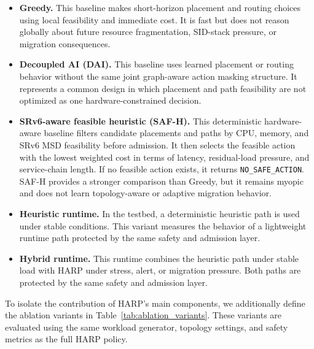 \documentclass[final,5p]{elsarticle}
\begin{document}
\begin{itemize}
    \item \textbf{Greedy.} This baseline makes short-horizon placement and routing choices using local feasibility and immediate cost. It is fast but does not reason globally about future resource fragmentation, SID-stack pressure, or migration consequences.
    \item \textbf{Decoupled AI (DAI).} This baseline uses learned placement or routing behavior without the same joint graph-aware action masking structure. It represents a common design in which placement and path feasibility are not optimized as one hardware-constrained decision.
    \item \textbf{SRv6-aware feasible heuristic (SAF-H).} This deterministic hardware-aware baseline filters candidate placements and paths by CPU, memory, and SRv6 MSD feasibility before admission. It then selects the feasible action with the lowest weighted cost in terms of latency, residual-load pressure, and service-chain length. If no feasible action exists, it returns \texttt{NO\_SAFE\_ACTION}. SAF-H provides a stronger comparison than Greedy, but it remains myopic and does not learn topology-aware or adaptive migration behavior.

    \item \textbf{Heuristic runtime.} In the testbed, a deterministic heuristic path is used under stable conditions. This variant measures the behavior of a lightweight runtime path protected by the same safety and admission layer.
    \item \textbf{Hybrid runtime.} This runtime combines the heuristic path under stable load with HARP under stress, alert, or migration pressure. Both paths are protected by the same safety and admission layer.
\end{itemize}

To isolate the contribution of HARP's main components, we additionally define the ablation variants in Table~\ref{tab:ablation_variants}. These variants are evaluated using the same workload generator, topology settings, and safety metrics as the full HARP policy.
\end{document}
